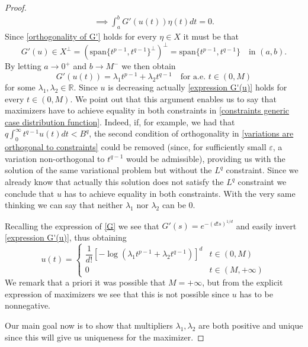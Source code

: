 \documentclass[corpo=11pt, stile=classica, tipotesi=custom,
greek, evenboxes, english]{toptesi}
\numberwithin{equation}{chapter}
\theoremstyle{remark}
\newcommand{\R}{\mathbb{R}} %
\begin{document}
\begin{proof}
{\begin{gather}
	\implies \int_a^b G'(u(t)) \eta(t) dt = 0. \label{orthogonality of G'}
\end{gather}}
Since \eqref{orthogonality of G'} holds for every $\eta \in X$ it must be that 
\begin{equation*}
	G'(u) \in X^{\perp} = \left(\mathrm{span}\{t^{p-1},t^{q-1}\}^{\perp}\right)^{\perp} = \mathrm{span}\{t^{p-1},t^{q-1}\} \quad \text{in } (a,b).
\end{equation*}
By letting $a \rightarrow 0^+$ and $b \rightarrow M^-$ we then obtain
\begin{equation}\label{expression G'(u)}
	G'(u(t)) = \lambda_1 t^{p-1} + \lambda_2 t^{q-1} \quad \text{for a.e. } t \in (0,M)
\end{equation}
for some $\lambda_1,\lambda_2 \in \R$. Since $u$ is decreasing actually \eqref{expression G'(u)} holds for every $t \in (0,M)$. {\color{red} We point out that this argument enables us to say that maximizers have to achieve equality in both constraints in \eqref{constraints generic case distribution function}. Indeed, if, for example, we had that $q \int_0^{\infty} t^{q-1}u(t)dt < B^q$, the second condition of orthogonality in \eqref{variations are orthogonal to constraints} could be removed (since, for sufficiently small $\varepsilon$, a variation non-orthogonal to $t^{q-1}$ would be admissible), providing us with the solution of the same variational problem but without the $L^q$ constraint. Since we already know that actually this solution does not satisfy the $L^q$ constraint we conclude that $u$ has to achieve equality in both constraints. With the very same thinking we can say that neither $\lambda_1$ nor $\lambda_2$ can be 0.}


 Recalling the expression of \eqref{G} we see that $G'(s) = e^{-(d!s)^{1/d}}$ and {\color{blue} easily invert \eqref{expression G'(u)}}, thus obtaining
\begin{equation}\label{expression u}
	u(t) = \begin{cases}
		\dfrac{1}{d!} \left[-\log\left(\lambda_1 t^{p-1} + \lambda_2 t^{q-1}\right) \right]^d & t \in (0,M)\\
		0 & t \in (M,+\infty)
	\end{cases}
\end{equation}
We remark that a priori it was possible that $M=+\infty$, but from the explicit expression of maximizers we see that this is not possible since $u$ has to be nonnegative.

Our main goal now is to show that multipliers $\lambda_1, \lambda_2$ are both positive and unique since this will give us uniqueness for the maximizer.


\end{proof}
\end{document}
